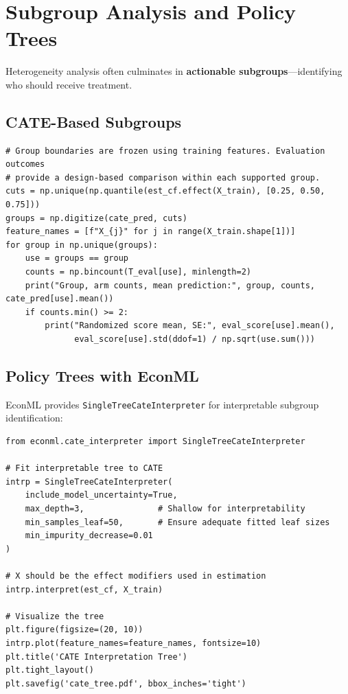 \section{Subgroup Analysis and Policy Trees}\label{sec:ch09_subgroups}

Heterogeneity analysis often culminates in \textbf{actionable subgroups}---identifying who should receive treatment.

\subsection{CATE-Based Subgroups}

\begin{verbatim}
# Group boundaries are frozen using training features. Evaluation outcomes
# provide a design-based comparison within each supported group.
cuts = np.unique(np.quantile(est_cf.effect(X_train), [0.25, 0.50, 0.75]))
groups = np.digitize(cate_pred, cuts)
feature_names = [f"X_{j}" for j in range(X_train.shape[1])]
for group in np.unique(groups):
    use = groups == group
    counts = np.bincount(T_eval[use], minlength=2)
    print("Group, arm counts, mean prediction:", group, counts, cate_pred[use].mean())
    if counts.min() >= 2:
        print("Randomized score mean, SE:", eval_score[use].mean(),
              eval_score[use].std(ddof=1) / np.sqrt(use.sum()))
\end{verbatim}

\subsection{Policy Trees with EconML}

EconML provides \texttt{SingleTreeCateInterpreter} for interpretable subgroup identification:

\begin{verbatim}
from econml.cate_interpreter import SingleTreeCateInterpreter

# Fit interpretable tree to CATE
intrp = SingleTreeCateInterpreter(
    include_model_uncertainty=True,
    max_depth=3,               # Shallow for interpretability
    min_samples_leaf=50,       # Ensure adequate fitted leaf sizes
    min_impurity_decrease=0.01
)

# X should be the effect modifiers used in estimation
intrp.interpret(est_cf, X_train)

# Visualize the tree
plt.figure(figsize=(20, 10))
intrp.plot(feature_names=feature_names, fontsize=10)
plt.title('CATE Interpretation Tree')
plt.tight_layout()
plt.savefig('cate_tree.pdf', bbox_inches='tight')
\end{verbatim}

